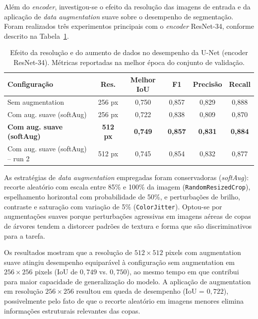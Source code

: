 Além do \textit{encoder}, investigou-se o efeito da resolução das imagens de entrada e da aplicação de \textit{data augmentation} suave sobre o desempenho de segmentação. Foram realizados três experimentos principais com o \textit{encoder} ResNet-34, conforme descrito na Tabela~\ref{tab:res_aug}.

\begin{table}[H]
    \centering
    \caption[Impacto da resolução e augmentation na segmentação]{Efeito da resolução e do aumento de dados no desempenho da U-Net (encoder ResNet-34). Métricas reportadas na melhor época do conjunto de validação.}
    \label{tab:res_aug}
    \begin{tabular}{lccccc}
        \toprule
        \textbf{Configuração}         & \textbf{Res.} & \textbf{Melhor IoU} & \textbf{F1} & \textbf{Precisão} & \textbf{Recall} \\
        \midrule
        Sem augmentation              & 256 px & 0,750 & 0,857 & 0,829 & 0,888 \\
        Com aug. suave (softAug)      & 256 px & 0,722 & 0,838 & 0,809 & 0,870 \\
        \textbf{Com aug. suave (softAug)} & \textbf{512 px} & \textbf{0,749} & \textbf{0,857} & \textbf{0,831} & \textbf{0,884} \\
        Com aug. suave (softAug) -- run 2 & 512 px & 0,745 & 0,854 & 0,832 & 0,877 \\
        \bottomrule
    \end{tabular}
\end{table}

As estratégias de \textit{data augmentation} empregadas foram conservadoras (\textit{softAug}): recorte aleatório com escala entre 85\% e 100\% da imagem (\texttt{RandomResizedCrop}), espelhamento horizontal com probabilidade de 50\%, e perturbações de brilho, contraste e saturação com variação de 5\% (\texttt{ColorJitter}). Optou-se por augmentações suaves porque perturbações agressivas em imagens aéreas de copas de árvores tendem a distorcer padrões de textura e forma que são discriminativos para a tarefa.

Os resultados mostram que a resolução de $512 \times 512$ pixels com augmentation suave atingiu desempenho equiparável à configuração sem augmentation em $256 \times 256$ pixels (IoU de $0{,}749$ vs. $0{,}750$), ao mesmo tempo em que contribui para maior capacidade de generalização do modelo. A aplicação de augmentation em resolução $256 \times 256$ resultou em queda de desempenho (IoU = $0{,}722$), possivelmente pelo fato de que o recorte aleatório em imagens menores elimina informações estruturais relevantes das copas.

